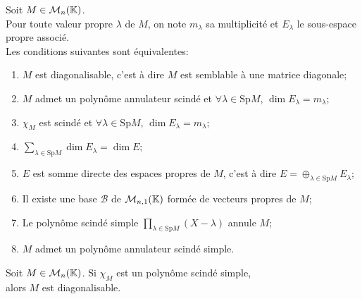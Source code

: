 \documentclass[a4paper]{book}
\begin{document}
\begin{Theoreme}
Soit $M\in \mathcal{M}_{n}(\mathbb{K})$.\\
Pour toute valeur propre $\lambda$ de $M$, on note $m_\lambda    $ sa multiplicité et $E_\lambda    $ le sous-espace propre associé.\\
Les conditions suivantes sont équivalentes:
\begin{enumerate}
\item $M$ est diagonalisable, c'est à dire  $M$ est semblable à une matrice diagonale;
\item $M$ admet un polynôme annulateur scindé et $\forall   \lambda    \in \mathrm{Sp} M$, $\dim E_\lambda    = m_\lambda    $;
\item $\chi_M$ est scindé et $\forall   \lambda    \in \mathrm{Sp} M$, $\dim E_\lambda    = m_\lambda    $;
\item $\sum_{\lambda    \in \mathrm{Sp} M} \dim E_\lambda     = \dim E$;
\item $E$ est somme directe des espaces propres de $M$, c'est à dire  $E = \oplus     _{\lambda    \in \mathrm{Sp} M} E_\lambda    $;
\item Il existe une base $\mathcal{B} $ de $\mathcal{M}_{n,1}(\mathbb{K})$ formée de vecteurs propres de $M$;
\item Le polynôme scindé simple $\prod_{\lambda    \in \mathrm{Sp} M}(X-\lambda    )$ annule $M$;
\item $M$ admet un polynôme annulateur scindé simple.
\end{enumerate}
\end{Theoreme}


\begin{Corollaire}
Soit $M\in \mathcal{M}_{n}(\mathbb{K})$.
Si $\chi_M$ est un polynôme scindé simple,\\
alors $M$ est diagonalisable.
\end{Corollaire}
\end{document}

